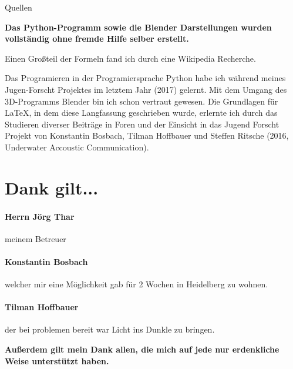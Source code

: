 Quellen

\begin{center}
 \textbf{
  Das Python-Programm sowie die Blender Darstellungen wurden vollständig ohne fremde Hilfe selber erstellt.
 }
\end{center}
\par Einen Großteil der Formeln fand ich durch eine Wikipedia Recherche.
\par Das Programieren in der Programiersprache Python habe ich während meines Jugen-Forscht Projektes im letztem Jahr (2017) gelernt. Mit dem Umgang des 3D-Programms Blender
bin ich schon vertraut gewesen. Die Grundlagen für \LaTeX, in dem diese Langfassung geschrieben wurde, erlernte ich durch das Studieren diverser Beiträge in Foren und der Einsicht
in das Jugend Forscht Projekt von Konstantin Bosbach, Tilman Hoffbauer und Steffen Ritsche (2016, Underwater Accoustic Communication).

\raggedleft
\section*{Dank gilt...}
\paragraph{Herrn Jörg Thar} meinem Betreuer
\paragraph{Konstantin Bosbach} welcher mir eine Möglichkeit gab für 2 Wochen in Heidelberg zu wohnen.
\paragraph{Tilman Hoffbauer} der bei problemen bereit war Licht ins Dunkle zu bringen.

\centering
\vspace{0.5cm} \textbf{Außerdem gilt mein Dank allen, die mich auf jede nur erdenkliche Weise unterstützt haben.}
